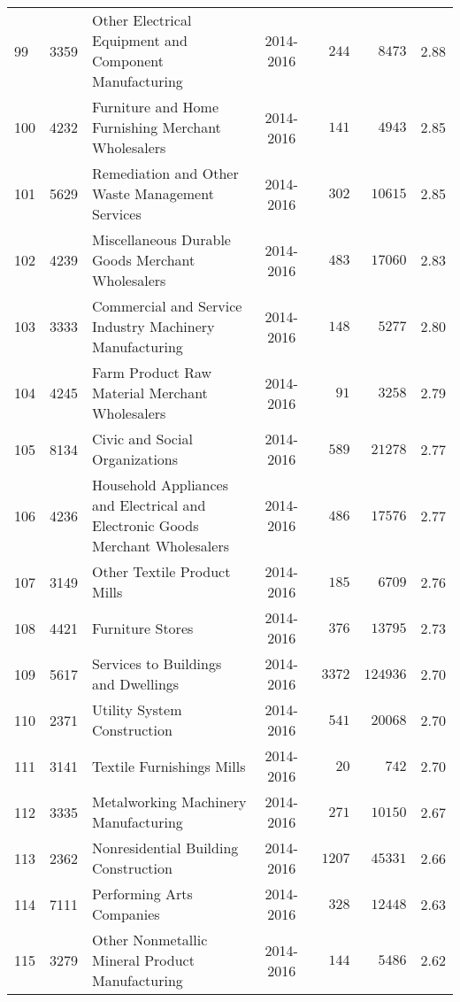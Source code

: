 \documentclass[9pt, oneside]{article}   	%
\begin{document}
\begin{longtable}{lcp{3in}cccc}
99  & 3359 & Other Electrical Equipment and Component Manufacturing & 2014-2016 & $\phantom{00}244$ & $\phantom{00}8473$ &  2.88 \\
100  & 4232 & Furniture and Home Furnishing Merchant Wholesalers & 2014-2016 & $\phantom{00}141$ & $\phantom{00}4943$ &  2.85 \\
101  & 5629 & Remediation and Other Waste Management Services & 2014-2016 & $\phantom{00}302$ & $\phantom{0}10615$ &  2.85 \\
102  & 4239 & Miscellaneous Durable Goods Merchant Wholesalers & 2014-2016 & $\phantom{00}483$ & $\phantom{0}17060$ &  2.83 \\
103  & 3333 & Commercial and Service Industry Machinery Manufacturing & 2014-2016 & $\phantom{00}148$ & $\phantom{00}5277$ &  2.80 \\
104  & 4245 & Farm Product Raw Material Merchant Wholesalers & 2014-2016 & $\phantom{000}91$ & $\phantom{00}3258$ &  2.79 \\
105  & 8134 & Civic and Social Organizations & 2014-2016 & $\phantom{00}589$ & $\phantom{0}21278$ &  2.77 \\
106  & 4236 & Household Appliances and Electrical and Electronic Goods Merchant Wholesalers & 2014-2016 & $\phantom{00}486$ & $\phantom{0}17576$ &  2.77 \\
107  & 3149 & Other Textile Product Mills & 2014-2016 & $\phantom{00}185$ & $\phantom{00}6709$ &  2.76 \\
108  & 4421 & Furniture Stores & 2014-2016 & $\phantom{00}376$ & $\phantom{0}13795$ &  2.73 \\
109  & 5617 & Services to Buildings and Dwellings & 2014-2016 & $\phantom{0}3372$ & $124936$ &  2.70 \\
110  & 2371 & Utility System Construction & 2014-2016 & $\phantom{00}541$ & $\phantom{0}20068$ &  2.70 \\
111  & 3141 & Textile Furnishings Mills & 2014-2016 & $\phantom{000}20$ & $\phantom{000}742$ &  2.70 \\
112  & 3335 & Metalworking Machinery Manufacturing & 2014-2016 & $\phantom{00}271$ & $\phantom{0}10150$ &  2.67 \\
113  & 2362 & Nonresidential Building Construction & 2014-2016 & $\phantom{0}1207$ & $\phantom{0}45331$ &  2.66 \\
114  & 7111 & Performing Arts Companies & 2014-2016 & $\phantom{00}328$ & $\phantom{0}12448$ &  2.63 \\
115  & 3279 & Other Nonmetallic Mineral Product Manufacturing & 2014-2016 & $\phantom{00}144$ & $\phantom{00}5486$ &  2.62 \\

\end{longtable}
\end{document}
